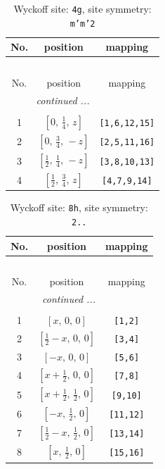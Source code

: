 \documentclass[fleqn,8pt]{jsarticle}
\begin{document}
\renewcommand{\arraystretch}{1.2}
\begin{longtable}{ccc}
\caption{Wyckoff site: {\tt 4g}, site symmetry: {\tt m'm'2}}
 \\
 \hline \hline
No. & position & mapping \\ \hline \endfirsthead

\multicolumn{2}{l}{\tablename\ \thetable{}} \\
 \hline \hline
No. & position & mapping \\ \hline \endhead

 \hline \hline
\multicolumn{2}{r}{\footnotesize\it continued ...} \\ \endfoot

 \hline \hline
\multicolumn{2}{r}{} \\ \endlastfoot

1 & $\left[ 0,\, \frac{1}{4},\, z \right]$ & {\tt [1,6,12,15]} \\ \hline
2 & $\left[ 0,\, \frac{3}{4},\, - z \right]$ & {\tt [2,5,11,16]} \\ \hline
3 & $\left[ \frac{1}{2},\, \frac{1}{4},\, - z \right]$ & {\tt [3,8,10,13]} \\ \hline
4 & $\left[ \frac{1}{2},\, \frac{3}{4},\, z \right]$ & {\tt [4,7,9,14]} \\
\end{longtable}
\renewcommand{\arraystretch}{1.2}
\begin{longtable}{ccc}
\caption{Wyckoff site: {\tt 8h}, site symmetry: {\tt 2..}}
 \\
 \hline \hline
No. & position & mapping \\ \hline \endfirsthead

\multicolumn{2}{l}{\tablename\ \thetable{}} \\
 \hline \hline
No. & position & mapping \\ \hline \endhead

 \hline \hline
\multicolumn{2}{r}{\footnotesize\it continued ...} \\ \endfoot

 \hline \hline
\multicolumn{2}{r}{} \\ \endlastfoot

1 & $\left[ x,\, 0,\, 0 \right]$ & {\tt [1,2]} \\ \hline
2 & $\left[ \frac{1}{2} - x,\, 0,\, 0 \right]$ & {\tt [3,4]} \\ \hline
3 & $\left[ - x,\, 0,\, 0 \right]$ & {\tt [5,6]} \\ \hline
4 & $\left[ x + \frac{1}{2},\, 0,\, 0 \right]$ & {\tt [7,8]} \\ \hline
5 & $\left[ x + \frac{1}{2},\, \frac{1}{2},\, 0 \right]$ & {\tt [9,10]} \\ \hline
6 & $\left[ - x,\, \frac{1}{2},\, 0 \right]$ & {\tt [11,12]} \\ \hline
7 & $\left[ \frac{1}{2} - x,\, \frac{1}{2},\, 0 \right]$ & {\tt [13,14]} \\ \hline
8 & $\left[ x,\, \frac{1}{2},\, 0 \right]$ & {\tt [15,16]} \\
\end{longtable}
\end{document}
